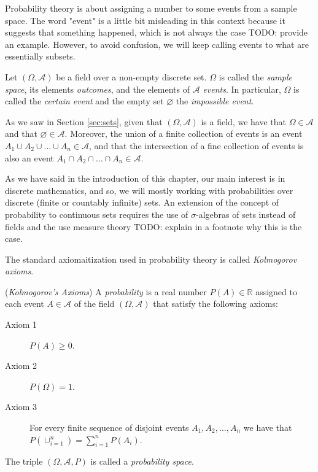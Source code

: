 Probability theory is about assigning a number to some events from a sample space. The word "event" is a little bit misleading in this context because it suggests that something happened, which is not always the case {\color{red} TODO: provide an example}. However, to avoid confusion, we will keep calling events to what are essentially subsets.

\begin{definition}
Let $\left( \Omega, \mathcal{A} \right)$ be a field over a non-empty discrete set. $\Omega$ is called the \emph{sample space}, its elements \emph{outcomes}, and the elements of $\mathcal{A}$ \emph{events}. In particular, $\Omega$ is called the \emph{certain event} and the empty set $\varnothing$ the \emph{impossible event}.
\end{definition}

As we saw in Section \ref{sec:sets}, given that $\left( \Omega, \mathcal{A} \right)$ is a field, we have that $\Omega \in \mathcal{A}$ and that $\varnothing \in \mathcal{A}$. Moreover, the union of a finite collection of events is an event $A_1 \cup A_2 \cup \ldots \cup A_n \in \mathcal{A}$, and that the intersection of a fine collection of events is also an event $A_1 \cap A_2 \cap \ldots \cap A_n \in \mathcal{A}$.

As we have said in the introduction of this chapter, our main interest is in discrete mathematics, and so, we will mostly working with probabilities over discrete (finite or countably infinite) sets. An extension of the concept of probability to continuous sets requires the use of $\sigma$-algebras of sets instead of fields and the use measure theory {\color{red} TODO: explain in a footnote why this is the case}.

The standard axiomaitization used in probability theory is called \emph{Kolmogorov axioms}.

\begin{definition} (\emph{Kolmogorov's Axioms})\label{Kolmogorov_axioms}
A \emph{probability} is a real number $P(A) \in \mathbb{R}$ assigned to each event $A \in \mathcal{A}$ of the field $\left( \Omega, \mathcal{A} \right)$ that satisfy the following axioms:

\medskip

\begin{description}
\item [Axiom 1] $P(A) \geq 0$.
\item [Axiom 2] $P(\Omega) = 1$.
\item [Axiom 3] For every finite sequence of disjoint events $A_1, A_2, \ldots, A_n$ we have that $P(\cup_{i=1}^n) = \sum_{i=1}^n P(A_i)$.
\end{description}

The triple $\left( \Omega, \mathcal{A}, P \right)$ is called a \emph{probability space}. 
\end{definition}

